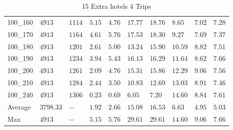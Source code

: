 \begin{center}
\begin{table}[]
\begin{adjustwidth}{-0.4in}{-1in}
\begin{tabular}{|lll|l|l|ll|lll|}
100\_160 & $4913   $   & $1114$ & $5.15$ & $4.76$   & $17.77$    & $18.76$   & $8.65 $& $7.02$   & $7.28$ \\
100\_170 & $4913   $   & $1164$ & $4.61$ & $5.76$   & $17.53$    & $18.30$   & $9.27 $& $7.69$   & $7.37$ \\
100\_180 & $4913   $   & $1201$ & $2.61$ & $5.00$   & $13.24$    & $15.90$   & $10.59$& $8.82$   & $7.51$ \\
100\_190 & $4913   $   & $1234$ & $3.94$ & $5.43$   & $16.13$    & $16.29$   & $11.64$& $8.62$   & $7.66$ \\
100\_200 & $4913   $   & $1261$ & $2.09$ & $4.76$   & $15.31$    & $15.86$   & $12.29$& $9.06$   & $7.56$ \\
100\_210 & $4913   $   & $1284$ & $2.44$ & $3.50$   & $10.83$    & $12.69$   & $13.03$& $8.91$   & $7.46$ \\
100\_240 & $4913   $   & $1306$ & $0.23$ & $0.69$   & $6.05$    & $7.20$   & $14.60$& $8.84$   & $7.61$ \\
\hline
Average  & $3798.33$   & $-   $ & $1.92$ & $2.66$   & $15.08$    & $16.53$   & $6.63 $& $4.95$   & $5.03$ \\
Max      & $4913   $   & $-   $ & $5.15$ & $5.76$   & $29.61$    & $29.61$   & $14.60$& $9.06$   & $7.66$ \\
\hline
\end{tabular}
    \end{adjustwidth}
    \caption{15 Extra hotels 4 Trips}
    \label{15-4}
    \end{table}
\end{center}

